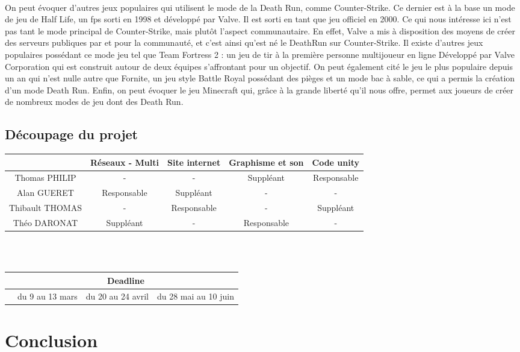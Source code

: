 \documentclass[12pt]{report}
\begin{document}
	\paragraph{}
	On peut évoquer d'autres jeux populaires qui utilisent le mode de la Death Run, comme Counter-Strike. Ce dernier est à la base un mode de jeu de Half Life, un fps sorti en 1998 et développé par Valve. Il est sorti en tant que jeu officiel en 2000. Ce qui nous intéresse ici n'est pas tant le mode principal de Counter-Strike, mais plutôt l'aspect communautaire. En effet, Valve a mis à disposition des moyens de créer des serveurs publiques par et pour la communauté, et c'est ainsi qu'est né le DeathRun sur Counter-Strike.
	Il existe d'autres jeux populaires possédant ce mode jeu tel que Team Fortress 2 : un jeu de tir à la première personne multijoueur en ligne Développé par Valve Corporation qui est construit autour de deux équipes s'affrontant pour un objectif. On peut également cité le jeu le plus populaire depuis un an qui n'est nulle autre que Fornite, un jeu style Battle Royal possédant des pièges et un mode bac à sable, ce qui a permis la création d'un mode Death Run. Enfin, on peut évoquer le jeu Minecraft qui, grâce à la grande liberté qu'il nous offre, permet aux joueurs de créer de nombreux modes de jeu dont des Death Run.
	
	\subsection{Découpage du projet} %
		
	
	
	\begin{tabular}{|*{5}{c|}}
	\hline
		& Réseaux - Multi & Site internet & Graphisme et son & Code unity \\
		\hline
		Thomas PHILIP & - & - & Suppléant & Responsable \\
		\hline
		Alan GUERET & Responsable & Suppléant & - & - \\
		\hline
		Thibault THOMAS & - & Responsable & - & Suppléant \\
		\hline
		Théo DARONAT & Suppléant & - & Responsable & - \\
		\hline
	
	\end{tabular}
	\\
	\\
	
	\begin{tabular}{|*{4}{c|}}
	\hline
	& \multicolumn{3}{|c|}{Deadline}\\
	\hline
	& du 9 au 13 mars & du 20 au 24 avril & du 28 mai au 10 juin \\
	\hline
	
	\end{tabular}
\section{Conclusion}
\end{document}
